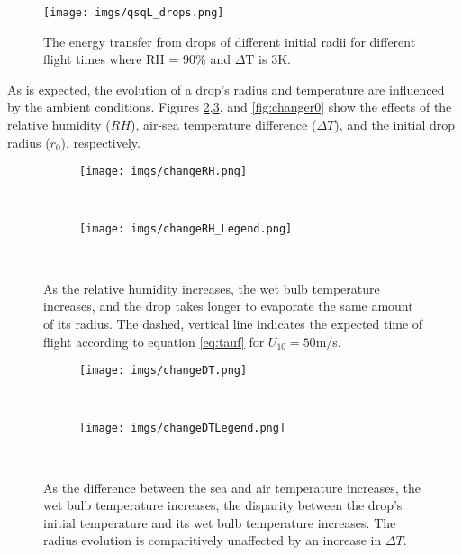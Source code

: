 \documentclass[10pt,a4paper]{article}
\begin{document}
\begin{figure}[h!]
    \centering
        \texttt{[image: imgs/qsqL\_drops.png]}        
       \caption{The energy transfer from drops of different initial radii for different flight times where RH = 90\% and $\Delta$T is 3K. }
       \label{fig:qsqL}
\end{figure}

As is expected, the evolution of a drop's radius and temperature are influenced by the ambient conditions. Figures \ref{fig:changeRH},\ref{fig:changeDT}, and \ref{fig:changer0} show the effects of the relative humidity ($RH$), air-sea temperature difference ($\Delta T$), and the initial drop radius ($r_0$), respectively. 

\begin{figure}[h!]
    \centering
    \begin{subfigure}[t!]{0.75\textwidth}
        \texttt{[image: imgs/changeRH.png]}        
    \end{subfigure}
    ~ %
    \begin{subfigure}[t!]{0.2\textwidth}
        \hspace*{-4.5in}\vspace*{-1.7in}\texttt{[image: imgs/changeRH\_Legend.png]}        
    \end{subfigure}
    ~ %
       \caption{As the relative humidity increases, the wet bulb temperature increases, and the drop takes longer to evaporate the same amount of its radius. The dashed, vertical line indicates the expected time of flight according to equation \ref{eq:tauf} for $U_{10} = 50$m/s.  \label{fig:changeRH}}
\end{figure}

\begin{figure}[h!]
    \centering
    \begin{subfigure}[t!]{0.75\textwidth}
        \texttt{[image: imgs/changeDT.png]}        
    \end{subfigure}
    ~ %
    \begin{subfigure}[t!]{0.23\textwidth}
        \hspace*{-4in}\vspace*{2in}\texttt{[image: imgs/changeDTLegend.png]}        
    \end{subfigure}
    ~ %
       \caption{As the difference between the sea and air temperature increases, the wet bulb temperature increases, the disparity between the drop's initial temperature and its wet bulb temperature increases. The radius evolution is comparitively unaffected by an increase in $\Delta T$.\label{fig:changeDT}}
\end{figure}
\end{document}
